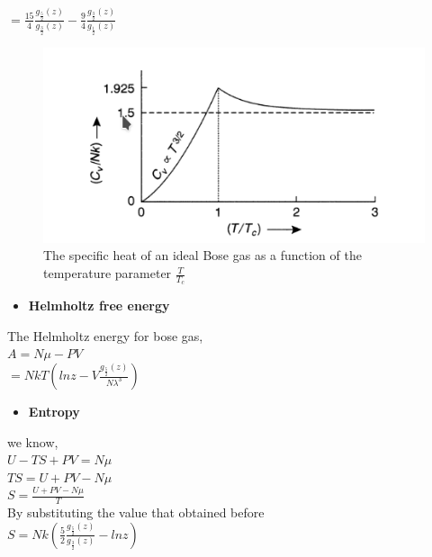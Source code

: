 \documentclass{article}
\newcommand*{\1}{\hspace{1pt}}
\begin{document}
$ =\frac{15}{4}\frac{g_\frac{5}{2}(z)}{g_\frac{3}{2}(z)}-\frac{9}{4}\frac{g_\frac{3}{2}(z)}{g_\frac{1}{2}(z)} $\\

\begin{figure}[htb!]
    \centering
    \includegraphics[scale=0.7]{lamia2}
    \caption{The specific heat of an ideal Bose gas as a function of the temperature parameter $\frac{T}{T_c}$}
    \label{fig:my_label}
\end{figure}
\begin{itemize}
    \item \textbf{Helmholtz free energy}
\end{itemize}

The Helmholtz energy for bose gas,\\

$A=N\mu-PV$\\

$ = NkT(lnz-V\frac{g_\frac{5}{2}(z)}{N\lambda^3})$\\


\begin{itemize}
    \item \textbf{Entropy}
\end{itemize}

we know,\\

$U-TS+PV=N\mu$\\


$ TS=U+PV-N\mu$\\

$S=\frac{U+PV-N\mu}{T}$\\

By substituting the value that obtained before\\


$ S =Nk(\frac{5}{2}\frac{g_\frac{5}{2}(z)}{g_\frac{3}{2}(z)}-lnz )$\\
\end{document}
